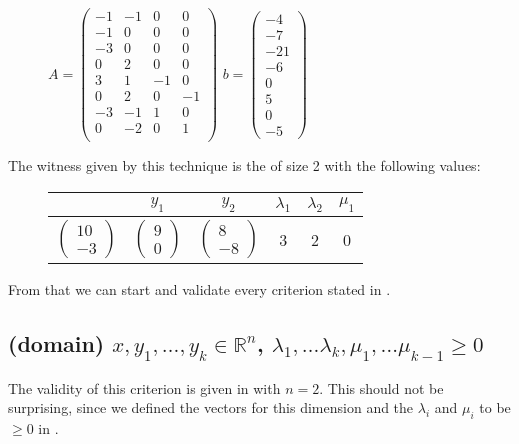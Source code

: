 \begin{figure}[H]
	\centering
	$A=\begin{pmatrix}
		-1 		& -1 		&  0		& 0		 \\
		-1 		& 0 		&  0		& 0		 \\
		-3 		& 0 		&  0		& 0		 \\
		0 		& 2 		&  0		& 0		 \\
		3 		& 1 		&  -1		& 0		 \\
		0 		& 2 		&  0		& -1	 \\
		-3 		& -1 		&  1		& 0		 \\
		0 		& -2 		&  0		& 1	 	 \\
	\end{pmatrix}$	
	$b=\begin{pmatrix}
		-4 \\ -7 \\ -21 \\ -6 \\ 0 \\ 5 \\ 0 \\ -5
	\end{pmatrix}$
\end{figure}
The witness given by this technique is the \gna of size 2 with the following values:
\begin{figure}[H]
	\label{ex:gna}
	\centering
	\begin{tabular}{|c|c|c|c|c|c|}
		\hline
		\stem & $y_1$ & $y_2$ & $\lambda_1$ & $\lambda_2$ & $\mu_1$ \\ \hline
		$\begin{pmatrix} 10 \\ -3 \end{pmatrix}$ & $\begin{pmatrix} 9 \\ 0 \end{pmatrix}$ & $\begin{pmatrix} 8 \\ -8 \end{pmatrix}$ & 3 & 2 & 0 \\ \hline
	\end{tabular}
\end{figure}
From that we can start and validate every criterion stated in .

	\subsection[Verifying: domain criterion]{(domain)	$x, y_1, \dots, y_k \in \mathbb{R}^n$, $\lambda_1, \dots \lambda_k, \mu_1, \dots \mu_{k-1} \ge 0$ }
		The validity of this criterion is given in  with $n=2$. This should not be surprising, since we defined the vectors for this dimension and the $\lambda_i$ and $\mu_i$ to be $\ge 0$ in .
		
